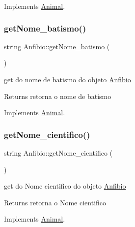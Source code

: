 Implements \mbox{\hyperlink{class_animal}{Animal}}.

\mbox{\label{class_anfibio_ae7f36199c2619b68c1cebd8557c77cb5}} 
\subsubsection{\texorpdfstring{getNome\_batismo()}{getNome\_batismo()}}
{\footnotesize\ttfamily string Anfibio\+::get\+Nome\+\_\+batismo (\begin{DoxyParamCaption}{ }\end{DoxyParamCaption})\hspace{0.3cm}{\ttfamily [virtual]}}



get do nome de batismo do objeto \mbox{\hyperlink{class_anfibio}{Anfibio}} 

\begin{DoxyReturn}{Returns}
retorna o nome de batismo 
\end{DoxyReturn}


Implements \mbox{\hyperlink{class_animal}{Animal}}.

\mbox{\label{class_anfibio_a92ab6f59134b33955c84d2cc079be488}} 
\subsubsection{\texorpdfstring{getNome\_cientifico()}{getNome\_cientifico()}}
{\footnotesize\ttfamily string Anfibio\+::get\+Nome\+\_\+cientifico (\begin{DoxyParamCaption}{ }\end{DoxyParamCaption})\hspace{0.3cm}{\ttfamily [virtual]}}



get do Nome cientifico do objeto \mbox{\hyperlink{class_anfibio}{Anfibio}} 

\begin{DoxyReturn}{Returns}
retorna o Nome cientifico 
\end{DoxyReturn}


Implements \mbox{\hyperlink{class_animal}{Animal}}.

\mbox{\label{class_anfibio_af43db7375d863acb8832549f513f57ec}} 
